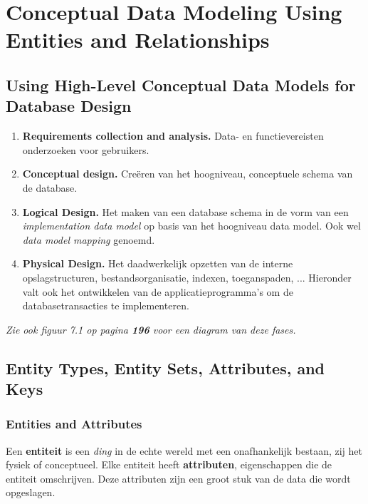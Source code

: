 \chapter{Conceptual Data Modeling Using Entities and Relationships}
\section{Using High-Level Conceptual Data Models for Database Design}
\begin{enumerate}
\item \textbf{Requirements collection and analysis.} Data- en functievereisten onderzoeken voor gebruikers.
\item \textbf{Conceptual design.} Cre\"eren van het hoogniveau, conceptuele schema van de database.
\item \textbf{Logical Design.} Het maken van een database schema in de vorm van een \textit{implementation data model} op basis van het hoogniveau data model. Ook wel \textit{data model mapping} genoemd.
\item \textbf{Physical Design.} Het daadwerkelijk opzetten van de interne opslagstructuren, bestandsorganisatie, indexen, toeganspaden, ... Hieronder valt ook het ontwikkelen van de applicatieprogramma's om de databasetransacties te implementeren.
\end{enumerate}
\textit{Zie ook figuur 7.1 op pagina \textbf{196} voor een diagram van deze fases.}


\setcounter{section}{2}


\section{Entity Types, Entity Sets, Attributes, and Keys}
\subsection{Entities and Attributes}
Een \textbf{entiteit} is een \textit{ding} in de echte wereld met een onafhankelijk bestaan, zij het fysiek of conceptueel. Elke entiteit heeft \textbf{attributen}, eigenschappen die de entiteit omschrijven. Deze attributen zijn een groot stuk van de data die wordt opgeslagen.

